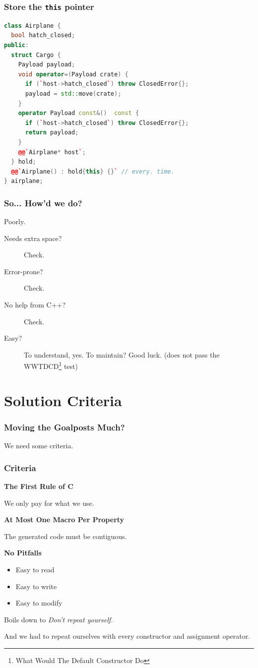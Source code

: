 \documentclass{beamer}
\def\code#1{\texttt{#1}}
\newcommand{\CC}{C\nolinebreak\hspace{-.05em}\raisebox{0.4ex}{\resizebox{!}{0.6\baselineskip}{\bf++}}}
\newcommand{\cplusplus}{\protect\CC\xspace}
\newcommand{\this}{\code{this}\xspace}
\newcommand{\nl}{\vspace{0.2\baselineskip}}
\begin{document}
\begin{frame}[fragile]
\frametitle{Store the \this pointer}
\begin{lstlisting}[language=cpp]
class Airplane {
  bool hatch_closed;
public:
  struct Cargo {
    Payload payload;
    void operator=(Payload crate) {
      if (`host->hatch_closed`) throw ClosedError{};
      payload = std::move(crate);
    }
    operator Payload const&()  const {
      if (`host->hatch_closed`) throw ClosedError{};
      return payload;
    }
    @@`Airplane* host`;
  } hold;
  @@`Airplane() : hold{this} {}` // every. time.
} airplane;
\end{lstlisting}
\end{frame}


\begin{frame}[fragile]
  \frametitle{So... How'd we do?}
\begin{center}
{\Huge Poorly.}
\end{center}
\begin{description}
  \item[Needs extra space?] Check.
  \item[Error-prone?] Check.
  \item[No help from C++?] Check.
  \item[Easy?] To understand, yes. To maintain? Good luck.
    (does not pass the WWTDCD\footnote{What Would The Default Constructor Do}
    test)
\end{description}
\end{frame}


\section{Solution Criteria}
\begin{frame}
  \frametitle{Moving the Goalposts Much?}
\begin{center}
{\Huge We need some criteria.}
\end{center}
\end{frame}


\begin{frame}[fragile]
  \frametitle{Criteria}
  \textbf{The First Rule of \cplusplus}\pause

  We only pay for what we use.\pause\nl\nl\nl


  \textbf{At Most One Macro Per Property}

  The generated code must be contiguous.\pause\nl\nl\nl

  \textbf{No Pitfalls}
  \begin{itemize}
    \item Easy to read
    \item Easy to write
    \item Easy to modify
  \end{itemize}

  \pause
  \begin{center}
    Boils down to \emph{Don't repeat yourself.}
    
    And we had to repeat ourselves with every constructor and assignment
    operator.
  \end{center}
\end{frame}
\end{document}
